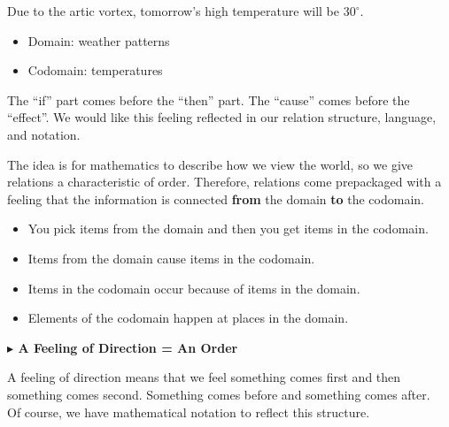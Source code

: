 \documentclass{ximera}
\begin{document}
\begin{idea}
Due to the artic vortex, tomorrow's high temperature will be $30^{\circ}$. \\

\begin{itemize}
    \item Domain: weather patterns
    \item Codomain: temperatures
\end{itemize}

\end{idea}

The ``if'' part comes before the ``then'' part.  The ``cause'' comes before the ``effect''.  We would like this feeling reflected in our relation structure, language, and notation.  


The idea is for mathematics to describe how we view the world, so we give relations a characteristic of order. Therefore, relations come prepackaged with a feeling that the information is connected \textbf{\textcolor{purple!85!blue}{from}} the domain \textbf{\textcolor{purple!85!blue}{to}} the codomain.






\begin{itemize}
\item You pick items from the domain and then you get items in the codomain.
\item Items from the domain cause items in the codomain.
\item Items in the codomain occur because of items in the domain.
\item Elements of the codomain happen at places in the domain.
\end{itemize}




\textbf{\textcolor{red!80!black}{$\blacktriangleright$ A Feeling of Direction = An Order}}

A feeling of direction means that we feel something comes first and then something comes second.  Something comes before and something comes after. \\


Of course, we have mathematical notation to reflect this structure. \\
\end{document}
